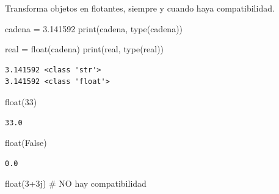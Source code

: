 \documentclass[
  spanish,
  letterpaper,
]{scrbook}
\newenvironment{Shaded}{\begin{snugshade}}{\end{snugshade}}
\newcommand{\BuiltInTok}[1]{\textcolor[rgb]{0.00,0.23,0.31}{#1}}
\newcommand{\CommentTok}[1]{\textcolor[rgb]{0.37,0.37,0.37}{#1}}
\newcommand{\DecValTok}[1]{\textcolor[rgb]{0.68,0.00,0.00}{#1}}
\newcommand{\NormalTok}[1]{\textcolor[rgb]{0.00,0.23,0.31}{#1}}
\newcommand{\OperatorTok}[1]{\textcolor[rgb]{0.37,0.37,0.37}{#1}}
\newcommand{\OtherTok}[1]{\textcolor[rgb]{0.00,0.23,0.31}{#1}}
\newcommand{\StringTok}[1]{\textcolor[rgb]{0.13,0.47,0.30}{#1}}
\newcommand{\VariableTok}[1]{\textcolor[rgb]{0.07,0.07,0.07}{#1}}
\theoremstyle{definition}
\theoremstyle{remark}
\begin{document}
Transforma objetos en flotantes, siempre y cuando haya compatibilidad.

\begin{Shaded}
\begin{Highlighting}[]
\NormalTok{cadena }\OperatorTok{=} \StringTok{\textquotesingle{}3.141592\textquotesingle{}}
\BuiltInTok{print}\NormalTok{(cadena, }\BuiltInTok{type}\NormalTok{(cadena))}

\NormalTok{real }\OperatorTok{=} \BuiltInTok{float}\NormalTok{(cadena)}
\BuiltInTok{print}\NormalTok{(real, }\BuiltInTok{type}\NormalTok{(real))}
\end{Highlighting}
\end{Shaded}

\begin{verbatim}
3.141592 <class 'str'>
3.141592 <class 'float'>
\end{verbatim}

\begin{Shaded}
\begin{Highlighting}[]
\BuiltInTok{float}\NormalTok{(}\DecValTok{33}\NormalTok{)}
\end{Highlighting}
\end{Shaded}

\begin{verbatim}
33.0
\end{verbatim}

\begin{Shaded}
\begin{Highlighting}[]
\BuiltInTok{float}\NormalTok{(}\VariableTok{False}\NormalTok{)}
\end{Highlighting}
\end{Shaded}

\begin{verbatim}
0.0
\end{verbatim}

\begin{Shaded}
\begin{Highlighting}[]
\BuiltInTok{float}\NormalTok{(}\DecValTok{3}\OperatorTok{+}\OtherTok{3j}\NormalTok{) }\CommentTok{\# NO hay compatibilidad}
\end{Highlighting}
\end{Shaded}
\end{document}
